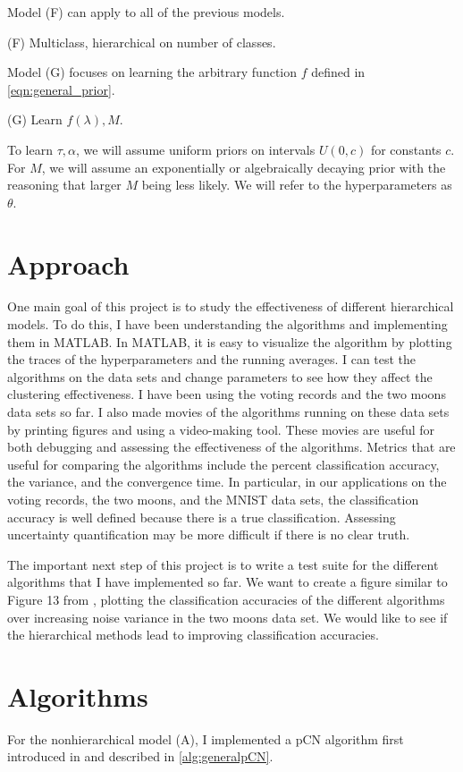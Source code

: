 \documentclass{siamart1116}
\begin{document}
Model (F) can apply to all of the previous models.

(F) Multiclass, hierarchical on number of classes.

Model (G) focuses on learning the arbitrary function $f$ defined in \cref{eqn:general_prior}. 

(G) Learn $f(\lambda), M$.

To learn $\tau, \alpha$, we will assume uniform priors on intervals $U(0, c)$ for constants $c$. For $M$, we will assume an exponentially or algebraically decaying prior with the reasoning that larger $M$ being less likely. We will refer to the hyperparameters as $\theta$.

\section{Approach}
One main goal of this project is to study the effectiveness of different hierarchical models. To do this, I have been understanding the algorithms and implementing them in MATLAB. In MATLAB, it is easy to visualize the algorithm by plotting the traces of the hyperparameters and the running averages. I can test the algorithms on the data sets and change parameters to see how they affect the clustering effectiveness. I have been using the voting records and the two moons data sets so far. I also made movies of the algorithms running on these data sets by printing figures and using a video-making tool. These movies are useful for both debugging and assessing the effectiveness of the algorithms. Metrics that are useful for comparing the algorithms include the percent classification accuracy, the variance, and the convergence time. In particular, in our applications on the voting records, the two moons, and the MNIST data sets, the classification accuracy is well defined because there is a true classification. Assessing uncertainty quantification may be more difficult if there is no clear truth.

The important next step of this project is to write a test suite for the different algorithms that I have implemented so far. We want to create a figure similar to Figure 13 from \cite{BeLuStZy17}, plotting the classification accuracies of the different algorithms over increasing noise variance in the two moons data set. We would like to see if the hierarchical methods lead to improving classification accuracies.

\section{Algorithms}
For the nonhierarchical model (A), I implemented a pCN algorithm first introduced in \cite{BeRoStVo08} and described in \cref{alg:generalpCN}.
\end{document}
